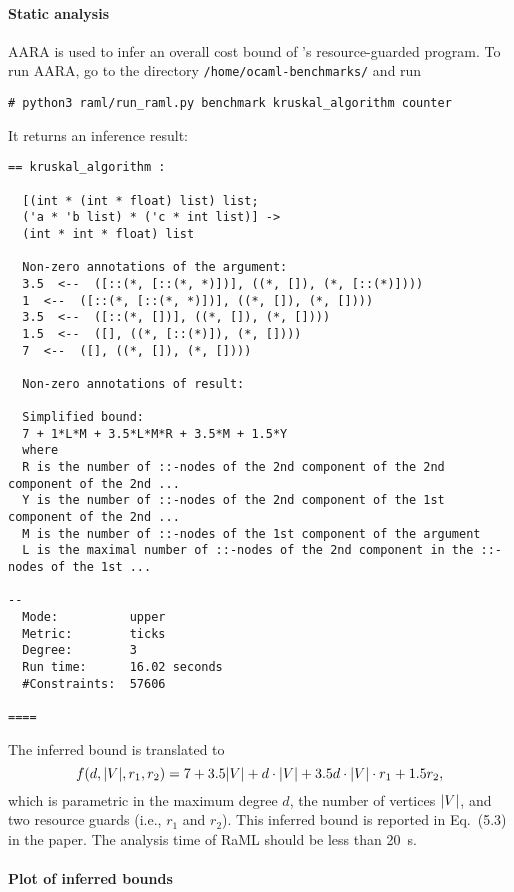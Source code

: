\paragraph{Static analysis}

AARA is used to infer an overall cost bound of \kruskal{}'s resource-guarded
program.
%
To run AARA, go to the directory \texttt{/home/ocaml-benchmarks/} and run
\begin{verbatim}
# python3 raml/run_raml.py benchmark kruskal_algorithm counter
\end{verbatim}
%
It returns an inference result:
\begin{Verbatim}[fontsize=\footnotesize]
== kruskal_algorithm :

  [(int * (int * float) list) list;
  ('a * 'b list) * ('c * int list)] ->
  (int * int * float) list

  Non-zero annotations of the argument:
  3.5  <--  ([::(*, [::(*, *)])], ((*, []), (*, [::(*)])))
  1  <--  ([::(*, [::(*, *)])], ((*, []), (*, [])))
  3.5  <--  ([::(*, [])], ((*, []), (*, [])))
  1.5  <--  ([], ((*, [::(*)]), (*, [])))
  7  <--  ([], ((*, []), (*, [])))

  Non-zero annotations of result:

  Simplified bound:
  7 + 1*L*M + 3.5*L*M*R + 3.5*M + 1.5*Y
  where
  R is the number of ::-nodes of the 2nd component of the 2nd component of the 2nd ...
  Y is the number of ::-nodes of the 2nd component of the 1st component of the 2nd ...
  M is the number of ::-nodes of the 1st component of the argument
  L is the maximal number of ::-nodes of the 2nd component in the ::-nodes of the 1st ...

--
  Mode:          upper
  Metric:        ticks
  Degree:        3
  Run time:      16.02 seconds
  #Constraints:  57606

====
\end{Verbatim}
%
The inferred bound is translated to
\begin{equation}
  f (d, |{V}|, r_1, r_2) = 7 + 3.5 |{V}| + d \cdot |{V}| + 3.5 d \cdot |{V}| \cdot r_1 + 1.5 r_2,
\end{equation}
which is parametric in the maximum degree $d$, the number of vertices $|{V}|$,
and two resource guards (i.e., $r_1$ and $r_2$).
%
This inferred bound is reported in Eq.~(5.3) in the paper.
%
The analysis time of RaML should be less than \qty{20}{\second}.

\paragraph{Plot of inferred bounds}

